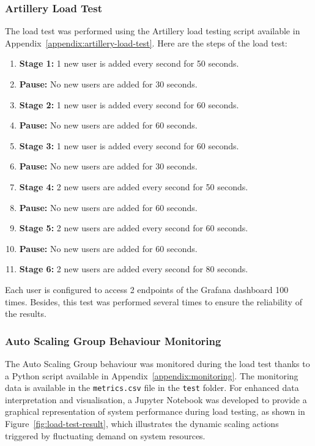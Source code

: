 \documentclass[12pt,oneside]{book} %
\begin{document}
\subsubsection{Artillery Load Test}
The load test was performed using the Artillery load testing script available
in Appendix~\ref{appendix:artillery-load-test}. Here are the steps of the load
test:
\begin{enumerate}
    \item \textbf{Stage 1:} 1 new user is added every second for 50 seconds.
    \item \textbf{Pause:} No new users are added for 30 seconds.
    \item \textbf{Stage 2:} 1 new user is added every second for 60 seconds.
    \item \textbf{Pause:} No new users are added for 60 seconds.
    \item \textbf{Stage 3:} 1 new user is added every second for 60 seconds.
    \item \textbf{Pause:} No new users are added for 30 seconds.
    \item \textbf{Stage 4:} 2 new users are added every second for 50 seconds.
    \item \textbf{Pause:} No new users are added for 60 seconds.
    \item \textbf{Stage 5:} 2 new users are added every second for 60 seconds.
    \item \textbf{Pause:} No new users are added for 60 seconds.
    \item \textbf{Stage 6:} 2 new users are added every second for 80 seconds.
\end{enumerate}
Each user is configured to access 2 endpoints of the Grafana dashboard 100 times. Besides, this test was performed several times to ensure the reliability of the results.

\subsubsection{Auto Scaling Group Behaviour Monitoring}
The Auto Scaling Group behaviour was monitored during the load test thanks to a
Python script available in Appendix~\ref{appendix:monitoring}. The monitoring
data is available in the \texttt{metrics.csv} file in the \texttt{test} folder.
For enhanced data interpretation and visualisation, a Jupyter Notebook was
developed to provide a graphical representation of system performance during
load testing, as shown in Figure~\ref{fig:load-test-result}, which illustrates
the dynamic scaling actions triggered by fluctuating demand on system
resources.
\end{document}

